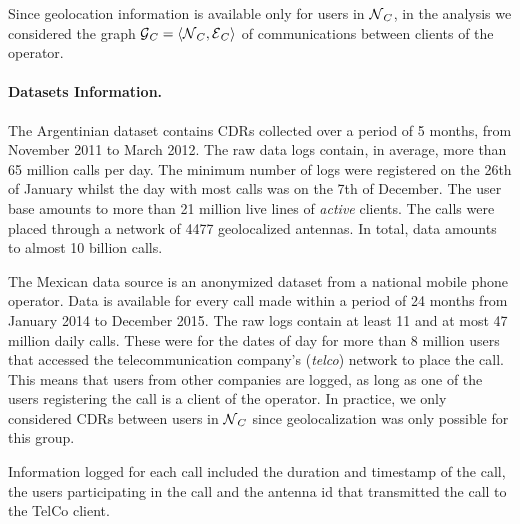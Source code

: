 Since geolocation information is available only for users in $\operatorname{\mathcal{N}}_C$, in the analysis we considered the graph $\operatorname{\mathcal{G}}_C = \left< \operatorname{\mathcal{N}}_C, \operatorname{\mathcal{E}}_C \right> $ of communications between clients of the operator.

\paragraph{Datasets Information.}

The Argentinian dataset contains CDRs collected over a period of 5 months, from November 2011 to March 2012. The raw data logs contain, in average, more than 65 million calls per day. The minimum number of logs were registered on the 26th of January whilst the day with most calls was on the 7th of December.  The user base amounts to more than 21 million live lines of \textit{active} clients. The calls were placed through a network of 4477 geolocalized antennas. In total, data amounts to almost 10 billion calls.

The Mexican data source is an anonymized dataset from a national mobile phone operator. Data is available for every call made within a period of 24 months from January 2014 to December 2015. The raw logs contain at least 11 and at most 47 million daily calls. These were for the dates of   day for more than 8 million users that accessed the telecommunication company's (\textit{telco}) network to place the call. This means that users from other companies are logged, as long as one of the users registering the call is a client of the operator. In practice, we only considered CDRs between users in $\operatorname{\mathcal{N}}_C$ since geolocalization was only possible for this group.

Information logged for each call included the duration and timestamp of the call, the users participating in the call and the antenna id that transmitted the call to the TelCo client.


